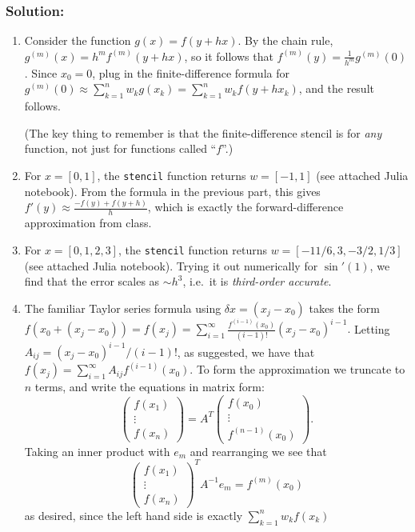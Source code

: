 \documentclass[10pt,oneside]{article}
\begin{document}
\subsubsection*{Solution:}

\begin{enumerate}
    \item Consider the function $g(x) = f(y+hx)$.  By the chain rule, $g^{(m)}(x) = h^m f^{(m)}(y+hx)$, so it follows that $f^{(m)}(y) = \frac{1}{h^m} g^{(m)}(0)$.  Since $x_0 = 0$, plug in the finite-difference formula for $g^{(m)}(0) \approx \sum_{k=1}^n w_k g(x_k) = \sum_{k=1}^n w_k f(y+h x_k)$, and the result follows.

    (The key thing to remember is that the finite-difference stencil is for \emph{any} function, not just for functions called ``$f$''.)
    \item For $x=[0,1]$, the \texttt{stencil} function returns $\boxed{w = [-1, 1]}$ (see attached Julia notebook).  From the formula in the previous part, this gives $\boxed{f'(y) \approx \frac{-f(y) + f(y+h)}{h}}$, which is exactly the forward-difference approximation from class.
    
    \item For $x=[0,1,2,3]$, the \texttt{stencil} function returns $w = [-11/6, 3, -3/2, 1/3]$ (see attached Julia notebook).  Trying it out numerically for $\sin'(1)$, we find that the error scales as $\boxed{\sim h^3}$, i.e.~it is \emph{third-order accurate}.

    
    \item  The familiar Taylor series formula using $\delta x = (x_j-x_0)$ takes the form
$f(x_0 + (x_j-x_0) ) = f(x_j)   = \sum_{i=1}^\infty \frac{f^{(i-1)}(x_0)}{ (i-1)! } (x_j -x_0)^{i-1}.$ Letting $A_{ij}=(x_j-x_0)^{i-1}/(i-1)!$, as suggested, we have that
$f(x_j) = \sum_{i=1}^\infty A_{ij} f^{(i-1)}(x_0)$.  To form the approximation we truncate to $n$ terms, and write the equations in matrix form:
$$
\begin{pmatrix}
f(x_1) \\ \vdots \\ f(x_n) 
\end{pmatrix}
=
A^T
\begin{pmatrix}
f(x_0) \\ \vdots \\ f^{(n-1)}(x_0) 
\end{pmatrix} .
$$
Taking an inner product with $e_m$ and rearranging we see that
$$ \begin{pmatrix}
f(x_1) \\ \vdots \\ f(x_n) 
\end{pmatrix}^T A^{-1}e_m = f^{(m)}(x_0)$$
as desired, since the left hand side is exactly $\sum_{k=1}^n w_k f(x_k)$

\end{enumerate}
\end{document}
